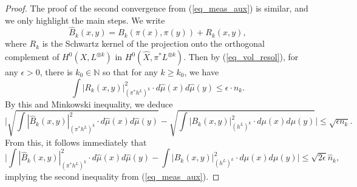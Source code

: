 \documentclass[10pt,a4paper]{amsart}
\newcommand{\nat}{\mathbb{N}}
\begin{document}
\begin{proof}
		\par 
		The proof of the second convergence from (\ref{eq_meas_aux}) is similar, and we only highlight the main steps. 
		We write 
		\begin{equation}
			\hat{B}_k(x, y) 
			=
			B_k(\pi(x), \pi(y))
			+
			R_k(x, y),
		\end{equation}
		where $R_k$ is the Schwartz kernel of the projection onto the orthogonal complement of $H^0(X, L^{\otimes k})$ in $H^0(\hat{X}, \pi^* L^{\otimes k})$.
		Then by (\ref{eq_vol_resol}), for any $\epsilon > 0$, there is $k_0 \in \nat$ so that for any $k \geq k_0$, we have 
		\begin{equation}
			\int |R_k(x, y)|^2_{(\pi^* h^L)^k} \cdot d \hat{\mu}(x) d \hat{\mu}(y)
			\leq
			\epsilon \cdot n_k.
		\end{equation}
		By this and Minkowski inequality, we deduce 
		\begin{equation}
			\bigg|
			\sqrt{ \int |\hat{B}_k(x, y)|^2_{(\pi^* h^L)^k} \cdot d \hat{\mu}(x) d \hat{\mu}(y)} 
			- 
			\sqrt{ \int |B_k(x, y)|^2_{(h^L)^k} \cdot d \mu(x) d \mu(y)}
			\bigg|
			\leq
			\sqrt{\epsilon n_k}.
		\end{equation}
		From this, it follows immediately that
		\begin{equation}
			\Big|
			\int |\hat{B}_k(x, y)|^2_{(\pi^* h^L)^k} \cdot d \hat{\mu}(x) d \hat{\mu}(y)
			- 
			\int |B_k(x, y)|^2_{(h^L)^k} \cdot d \mu(x) d \mu(y)
			\Big|
			\leq
			\sqrt{2 \epsilon} \hat{n}_k,
		\end{equation}
		implying the second inequality from (\ref{eq_meas_aux}).
	\end{proof}
\end{document}
